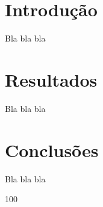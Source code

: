 \documentclass[dsc]{on} %
\begin{document}
\listoffigures
\listoftables
\tableofcontents

\mainmatter

\chapter{Introdu\c c\~ao}

Bla bla bla

\chapter{Resultados}

Bla bla bla

\chapter{Conclus\~oes}

Bla bla bla

\backmatter

%
%

\begin{thebibliography}{100}
%



%
\end{thebibliography}

\end{document}
